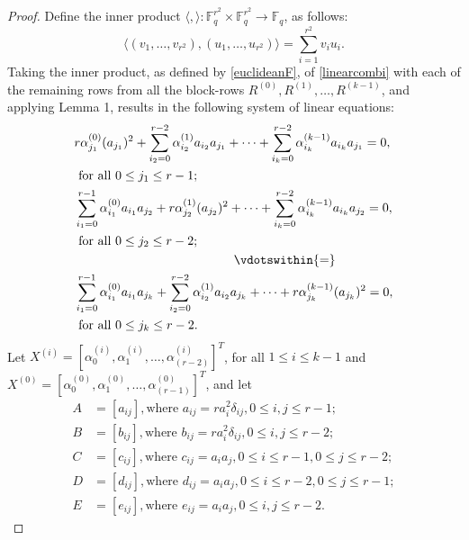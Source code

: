 \documentclass[conference]{IEEEtran}
\begin{document}
\begin{proof}
        Define the inner product $\langle,\rangle:\mathbb{F}_{q}^{r^{2}}\times \mathbb{F}_{q}^{r^{2}}\to \mathbb{F}_{q}$, as follows:		\begin{equation}\label{euclideanF}		\langle(v_{1},\ldots,v_{r^{2}}),(u_{1},\ldots,u_{r^{2}})\rangle=\sum_{i=1}^{r^{2}}v_{i}u_{i}.
	\end{equation}
Taking the inner product, as defined by \eqref{euclideanF}, of \eqref{linearcombi} with each of the remaining rows from all the block-rows  $R^{(0)}, R^{(1)}, \dots, R^{(k-1)}$, and applying Lemma 1, results in the following system of linear equations:	
	\begin{align*}
	& r\alpha_{j_{1}}^{(0)}(a_{j_{1}})^{2}+\sum\limits_{i_{2}=0}^{r-2}\alpha_{i_{2}}^{(1)}a_{i_{2}}a_{j_{1}}+\cdots+\sum\limits_{i_{k}=0}^{r-2}\alpha_{i_{k}}^{(k-1)}a_{i_{k}}a_{j_{1}}=0,\\
    &\text{ for all } 0\leq j_{1}\leq r-1;\\
	&\sum\limits_{i_{1}=0}^{r-1}\alpha_{i_{1}}^{(0)}a_{i_{1}}a_{j_{2}}+r\alpha_{j_{2}}^{(1)}(a_{j_{2}})^{2}+\cdots+\sum\limits_{i_{k}=0}^{r-2}\alpha_{i_{k}}^{(k-1)}a_{i_{k}}a_{j_{2}}=0,\\
    &\text{ for all } 0\leq j_{2}\leq r-2;\\
	&\hspace{44.5mm}\vdotswithin{=}\\	
	&\sum\limits_{i_{1}=0}^{r-1}\alpha_{i_{1}}^{(0)}a_{i_{1}}a_{j_{k}}+\sum\limits_{i_{2}=0}^{r-2}\alpha_{i_{2}}^{(1)}a_{i_{2}}a_{j_{k}}+\cdots+r\alpha_{j_{k}}^{(k-1)}(a_{j_{k}})^{2}=0,\\
    &\text{ for all } 0\leq j_{k}\leq r-2.
	\end{align*}	
    Let  $X^{(i)}=[\alpha^{(i)}_{0},\alpha^{(i)}_{1},\ldots,\alpha^{(i)}_{(r-2)}]^{T}$, for all {\small$1\leq i\leq k-1$} and $X^{(0)}=[\alpha^{(0)}_{0},\alpha^{(0)}_{1},\ldots,\alpha^{(0)}_{(r-1)}]^{T}$, and let
    \begin{align*}
        A&=[a_{ij}], \text{where } a_{ij}=ra_{i}^{2}\delta_{ij}, 0\leq i,j\leq r-1;\\
        B&=[b_{ij}], \text{where } b_{ij}=ra_{i}^{2}\delta_{ij}, 0\leq i,j\leq r-2;\\
        C&=[c_{ij}], \text{where }  c_{ij}=a_{i}a_{j},  0\leq i\leq r-1, 0\leq j\leq r-2;\\
        D&=[d_{ij}], \text{where }  d_{ij}=a_{i}a_{j}, 0\leq i\leq r-2,0\leq j\leq r-1;\\
        E&=[e_{ij}], \text{where } e_{ij}=a_{i}a_{j}, 0\leq i,j\leq r-2.
    \end{align*}

\end{proof}
\end{document}
